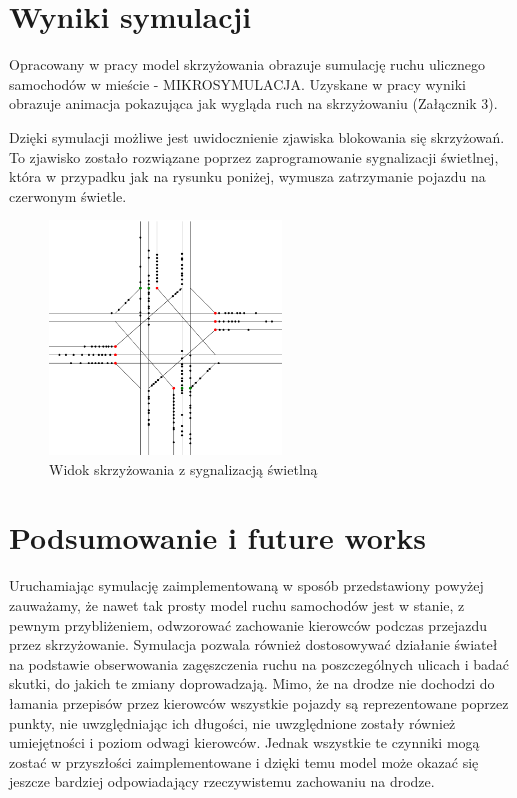\documentclass{sprawozdanie-agh}
\begin{document}
	\section{Wyniki symulacji}

	Opracowany w pracy model skrzyżowania obrazuje sumulację ruchu ulicznego samochodów w mieście - MIKROSYMULACJA. Uzyskane w pracy wyniki obrazuje animacja pokazująca jak wygląda ruch na skrzyżowaniu (Załącznik 3).

	Dzięki symulacji możliwe jest uwidocznienie zjawiska blokowania się skrzyżowań. To zjawisko zostało rozwiązane poprzez zaprogramowanie sygnalizacji świetlnej, która w przypadku jak na rysunku poniżej, wymusza zatrzymanie pojazdu na czerwonym świetle.

	\begin{figure}[H]
		\centering
		\captionsetup{justification=centering}
		\includegraphics[width=0.55\textwidth]{symulacja}
		\caption{Widok skrzyżowania z sygnalizacją świetlną}
		\label{fig:Wyniki_sym_1}
	\end{figure}

	\section{Podsumowanie i future works}

	Uruchamiając symulację zaimplementowaną w sposób przedstawiony powyżej zauważamy, że nawet tak prosty model ruchu samochodów jest w stanie, z pewnym przybliżeniem, odwzorować zachowanie kierowców podczas przejazdu przez skrzyżowanie. Symulacja pozwala również dostosowywać działanie świateł na podstawie obserwowania zagęszczenia ruchu na poszczególnych ulicach i badać skutki, do jakich te zmiany doprowadzają. Mimo, że na drodze nie dochodzi do łamania przepisów przez kierowców wszystkie pojazdy są reprezentowane poprzez punkty, nie uwzględniając ich długości, nie uwzględnione zostały również umiejętności i poziom odwagi kierowców. Jednak wszystkie te czynniki mogą zostać w przyszłości zaimplementowane i dzięki temu model może okazać się jeszcze bardziej odpowiadający rzeczywistemu zachowaniu na drodze.
\end{document}

